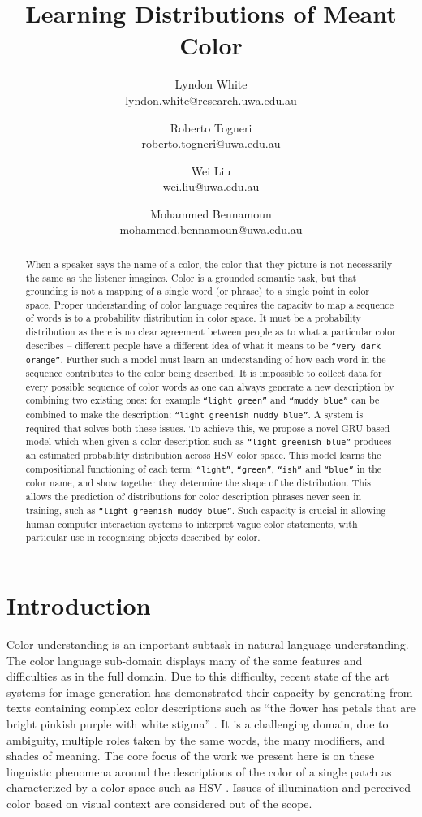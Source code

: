 \documentclass[11pt,letterpaper, twocolumn]{article}
\title{Learning Distributions of Meant Color}
\author{Lyndon White \\ lyndon.white@research.uwa.edu.au %
	\and Roberto Togneri \\ roberto.togneri@uwa.edu.au%
	\and Wei Liu \\ wei.liu@uwa.edu.au %
	\and Mohammed Bennamoun \\ mohammed.bennamoun@uwa.edu.au %
}
\newcommand{\parencite}{\citep}
\begin{document}
\maketitle

\begin{abstract}
When a speaker says the name of a color, the color that they picture is not necessarily the same as the listener imagines.
Color is a grounded semantic task, but that grounding is not a mapping of a single word (or phrase) to a single point in color space,
Proper understanding of color language requires the capacity to map a sequence of words is to a probability distribution in color space.
It must be a probability distribution as there is no clear agreement between people as to what a particular color describes -- different people have a different idea of what it means to be \texttt{``very dark orange''}.
Further such a model must learn an understanding of how each word in the sequence contributes to the color being described.
It is impossible to collect data for every possible sequence of color words as one can always generate a new description by combining two existing ones: for example \texttt{``light green''} and \texttt{``muddy blue''} can be combined to make the description: \texttt{``light greenish muddy blue''}.
A system is required that solves both these issues.
To achieve this, we propose a novel GRU based model which when given a color description such as \texttt{``light greenish blue''} produces an estimated probability distribution across HSV color space.
This model learns the compositional functioning of each term: \texttt{``light''}, \texttt{``green''}, \texttt{``ish''} and \texttt{``blue''} in the color name, and show together they determine the shape of the distribution.
This allows the prediction of  distributions for color description phrases never seen in training, such as \texttt{``light greenish muddy blue''}.
Such capacity is crucial in allowing human computer interaction systems to interpret vague color statements, with particular use in recognising objects described by color.
\end{abstract}

\section{Introduction}

Color understanding is an important subtask in natural language understanding.
The color language sub-domain displays many of the same features and difficulties as in the full domain.
Due to this difficulty, recent state of the art systems for image generation has demonstrated their capacity by generating from texts containing complex color descriptions such as ``the flower has petals that are bright pinkish purple with white stigma'' \parencite{reed2016generative, 2015arXiv151102793M}.
It is a challenging domain, due to ambiguity, multiple roles taken by the same words, the many modifiers, and shades of meaning.
The core focus of the work we present here is on these linguistic phenomena around the descriptions of the color of a single patch as characterized by a color space such as HSV \parencite{smith1978color}.
Issues of illumination and perceived color based on visual context are considered out of the scope.
\end{document}
